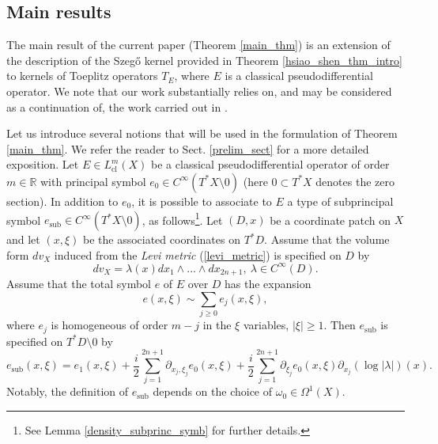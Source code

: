\documentclass{article}
\newcommand{\RR}{\mathbb R}
\DeclareMathOperator{\sub}{sub}
\DeclareMathOperator{\cl}{cl}
\begin{document}
\subsection{Main results}
%
The main result of the current paper (Theorem \ref{main_thm}) is an extension of the description of the Szeg\H{o} kernel provided in Theorem \ref{hsiao_shen_thm_intro} to kernels of Toeplitz operators $T_E$, where $E$ is a classical pseudodifferential operator. We note that our work substantially relies on, and may be considered as a continuation of, the work carried out in \cite{hsiao_shen}.
%

Let us introduce several notions that will be used in the formulation of Theorem \ref{main_thm}. We refer the reader to Sect. \ref{prelim_sect} for a more detailed exposition. Let $E \in L^m_{\cl}(X)$ be a classical pseudodifferential operator of order $m \in \RR$ with principal symbol $e_0 \in C^\infty(T^*X \setminus 0)$ (here $0 \subset T^*X$ denotes the zero section). In addition to $e_0$, it is possible to associate to $E$ a type of subprincipal symbol $e_{\sub} \in C^\infty(T^* X \setminus 0)$, as follows\footnote{See Lemma \ref{density_subprinc_symb} for further details.}. Let $(D,x)$ be a coordinate patch on $X$ and let $(x, \xi)$ be the associated coordinates on $T^*D$. Assume that the volume form $dv_X$ induced from the \textit{Levi metric} (\ref{levi_metric}) is specified on $D$ by $$dv_X = \lambda(x) dx_1 \wedge ... \wedge dx_{2n+1},\ \lambda \in C^\infty(D).$$ Assume that the total symbol $e$ of $E$ over $D$ has the expansion $$e(x,\xi) \sim \sum_{j \ge 0} e_j(x,\xi),$$
where $e_j$ is homogeneous of order $m-j$ in the $\xi$ variables, $|\xi| \ge 1$. Then $e_{\sub}$ is specified on $T^*D\setminus 0$ by $$e_{\sub}(x,\xi) = e_1(x,\xi) + \frac i 2 \sum_{j=1}^{2n+1} \partial_{x_j, \xi_j} e_0(x,\xi) +\frac i {2}\sum_{j=1}^{2n+1} \partial_{\xi_j} e_0(x,\xi) \partial_{x_j}(\log |\lambda|)(x).$$
%
Notably, the definition of $e_{\sub}$ depends on the choice of $\omega_0 \in \Omega^1(X)$.
%
%
%
\end{document}
